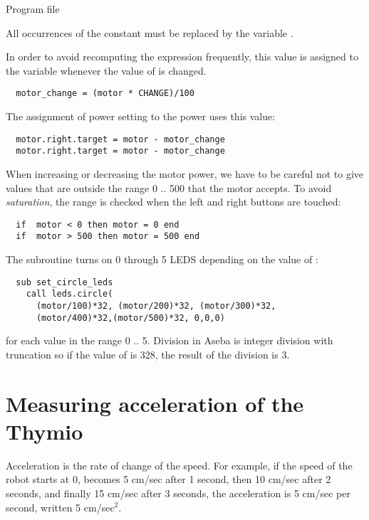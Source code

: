 
{\raggedleft \hfill Program file }

All occurrences of the constant  must be replaced by the
variable .

In order to avoid recomputing the expression 
frequently, this value is assigned to the variable 
whenever the value of  is changed.

\begin{verbatim}
  motor_change = (motor * CHANGE)/100
\end{verbatim}
The assignment of power setting to the power uses this value:
\begin{verbatim}
  motor.right.target = motor - motor_change
  motor.right.target = motor - motor_change
\end{verbatim}

When increasing or decreasing the motor power, we have to be careful not
to give values that are outside the range 0 .. 500 that the motor
accepts. To avoid \emph{saturation}, the range is checked when the
left and right buttons are touched:

\begin{verbatim}
  if  motor < 0 then motor = 0 end
  if  motor > 500 then motor = 500 end
\end{verbatim}

The subroutine  turns on 0 through 5 LEDS
depending on the value of :\label{p.leds}

\begin{verbatim}
  sub set_circle_leds
    call leds.circle(
      (motor/100)*32, (motor/200)*32, (motor/300)*32,
      (motor/400)*32,(motor/500)*32, 0,0,0)
\end{verbatim}
for each value in the range 0 .. 5. Division in Aseba is integer
division with truncation so if the value of  is 328, the result
of the division is 3.

\section{Measuring acceleration of the Thymio}

Acceleration is the rate of change of the speed. For example, if the
speed of the robot starts at 0, becomes 5 cm/sec after 1 second, then 10
cm/sec after 2 seconds, and finally 15 cm/sec after 3 seconds, the
acceleration is 5 cm/sec per second, written 5 cm/sec$^2$.

